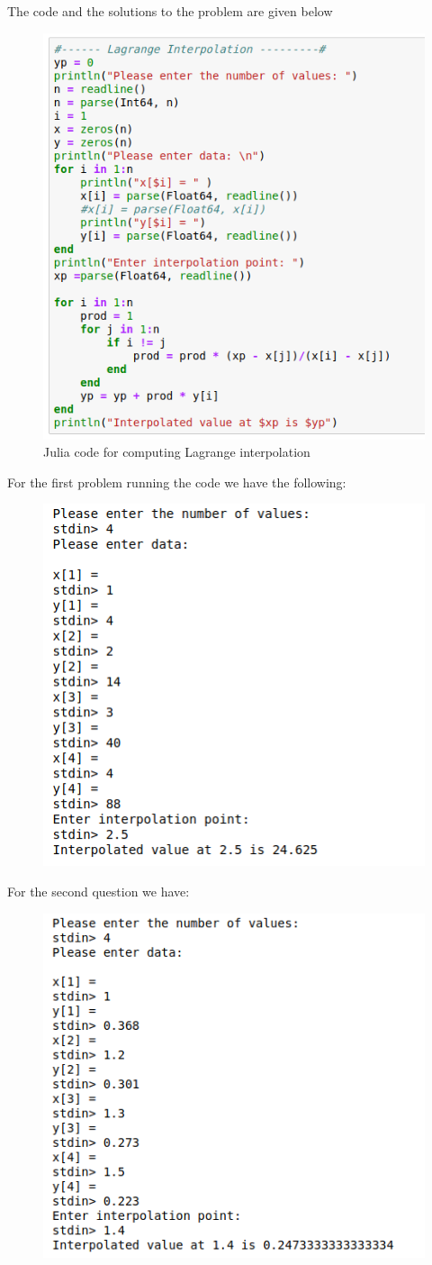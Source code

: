 \documentclass[a4paper,12pt,openany]{book}
\begin{document}
\begin{soln}
	The code and the solutions to the problem are given below 
	
	\begin{figure}[H]
		\centering
		\includegraphics[width= .7\linewidth]{pic9}
		\caption{Julia code for computing Lagrange interpolation}
	\end{figure}
For the first problem running the code we have the following:
\begin{figure}[H]
	\centering
	\includegraphics[width=.7\linewidth]{pic10}
\end{figure}
For the second question we have:
\begin{figure}[H]
	\centering
	\includegraphics[width=.6\linewidth]{pic11}
\end{figure}
\end{soln}
\end{document}
